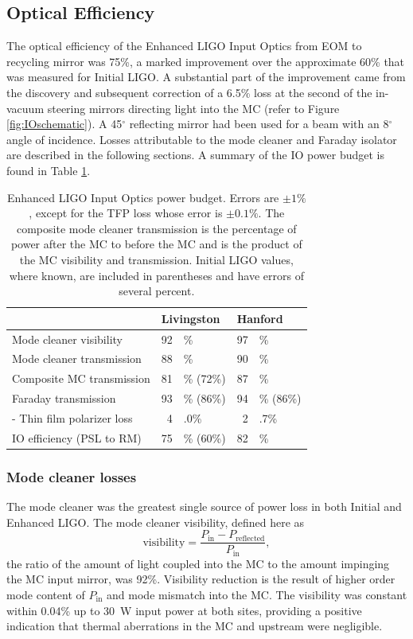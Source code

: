 \subsection{Optical Efficiency}
The optical efficiency of the Enhanced LIGO Input Optics from EOM to
recycling mirror was 75\%, a marked improvement over the approximate
60\% that was measured for Initial LIGO. A substantial part of the
improvement came from the discovery and subsequent correction of a
6.5\% loss at the second of the in-vacuum steering mirrors directing
light into the MC (refer to Figure \ref{fig:IOschematic}). A 45$^\circ$
reflecting mirror had been used for a beam with an 8$^\circ$ angle of
incidence. Losses attributable to the mode cleaner and Faraday
isolator are described in the following sections. A summary of the IO
power budget is found in Table \ref{tab:pwrbudget}.

\begin{table}
\centering
\caption[Enhanced LIGO Input Optics power budget.]{Enhanced LIGO Input
  Optics power budget. Errors are $\pm 1\%$, except for the TFP loss
  whose error is $\pm 0.1\%$. The 
  composite mode cleaner transmission is the percentage of power after the MC to
  before the MC and is the product of the MC visibility and
  transmission. Initial LIGO values,
  where known, are included in parentheses and have errors of several percent.}
\begin{tabular}{l r@{}l r@{}l}
\hline
 & \multicolumn{2}{l}{Livingston} & \multicolumn{2}{l}{Hanford} \\
\hline
Mode cleaner visibility & 92 & \% & 97 & \% \\
Mode cleaner transmission & 88 & \% & 90 & \% \\
Composite MC transmission & 81 & \% (72\%) & 87 & \% \\
Faraday transmission &       93 & \% (86\%) & 94 & \% (86\%) \\
\hspace{0.5cm} - Thin film polarizer loss & 4 & .0\% & 2 & .7\% \\ 
IO efficiency (PSL to RM) & 75 & \% (60\%) & 82 & \% \\
\hline
\end{tabular}
\label{tab:pwrbudget}
\end{table}


\subsubsection{Mode cleaner losses} 
The mode cleaner was the greatest single source of power loss in both
Initial and Enhanced LIGO. The mode cleaner visibility, defined here as
\begin{equation}
\mbox{visibility} = \frac{P_{\mathrm{in}} - P_{\mathrm{reflected}}}{P_{\mathrm{in}}},
\end{equation}
the ratio of the amount of light coupled into the MC to the amount
impinging the MC input mirror, was 92\%. Visibility
reduction is the result of higher order mode content of $P_{\mathrm{in}}$
and mode mismatch into the MC. The visibility was constant within
0.04\% up to 30~W input power at both sites, providing a positive
indication that thermal aberrations in the MC and upstream
were negligible.


